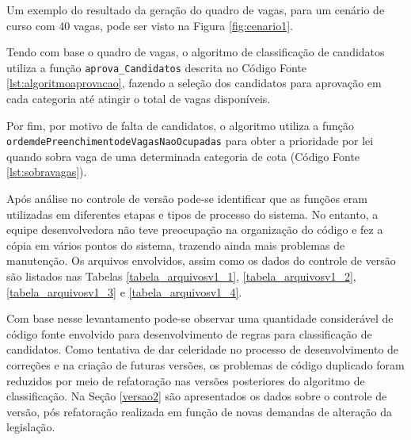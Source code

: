Um exemplo do resultado da geração do quadro de vagas, para um cenário de curso com 40 vagas,  pode ser visto na Figura \ref{fig:cenario1}.



\newpage
Tendo com base o quadro de vagas, o algoritmo de classificação de candidatos utiliza a função \texttt{aprova\_Candidatos} descrita no Código Fonte \ref{lst:algoritmoaprovacao}, fazendo a seleção dos candidatos para aprovação em cada categoria até atingir o total de vagas disponíveis. 



Por fim, por motivo de falta de candidatos, o algoritmo utiliza a função \texttt{ordemdePreenchimentodeVagasNaoOcupadas} para obter a prioridade por lei quando sobra vaga de uma determinada categoria de cota (Código Fonte \ref{lst:sobravagas}).

\newpage


Após análise no controle de versão pode-se identificar que as funções eram utilizadas em diferentes etapas e tipos de processo do sistema. No entanto, a equipe desenvolvedora não teve preocupação na organização do código e fez a cópia em vários pontos do sistema, trazendo ainda mais problemas de manutenção. Os arquivos envolvidos, assim como os dados do controle de versão são listados nas Tabelas \ref{tabela_arquivosv1_1}, \ref{tabela_arquivosv1_2}, \ref{tabela_arquivosv1_3} e \ref{tabela_arquivosv1_4}.



\newpage
Com base nesse levantamento pode-se observar uma quantidade considerável de código fonte envolvido para desenvolvimento de regras para classificação de candidatos. Como tentativa de dar celeridade no processo de desenvolvimento de correções e na criação de futuras versões, os problemas de código duplicado foram reduzidos por meio de refatoração nas versões posteriores do algoritmo de classificação. Na Seção \ref{versao2} são apresentados os dados sobre o controle de versão, pós refatoração realizada em função de novas demandas de alteração da legislação.
